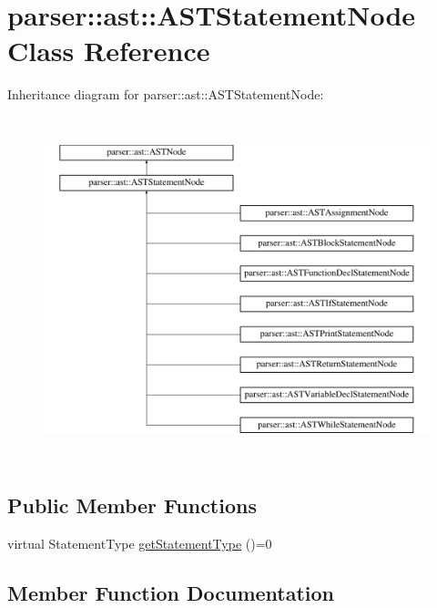 \hypertarget{classparser_1_1ast_1_1ASTStatementNode}{}\section{parser\+:\+:ast\+:\+:A\+S\+T\+Statement\+Node Class Reference}
\label{classparser_1_1ast_1_1ASTStatementNode}
Inheritance diagram for parser\+:\+:ast\+:\+:A\+S\+T\+Statement\+Node\+:\begin{figure}[H]
\begin{center}
\leavevmode
\includegraphics[height=10.000000cm]{de/dbf/classparser_1_1ast_1_1ASTStatementNode}
\end{center}
\end{figure}
\subsection*{Public Member Functions}
\begin{DoxyCompactItemize}
\item 
virtual Statement\+Type \hyperlink{classparser_1_1ast_1_1ASTStatementNode_ac381d35d12f774a1bab0e209c5bfec1f}{get\+Statement\+Type} ()=0
\end{DoxyCompactItemize}


\subsection{Member Function Documentation}
\mbox{\label{classparser_1_1ast_1_1ASTStatementNode_ac381d35d12f774a1bab0e209c5bfec1f}} 

